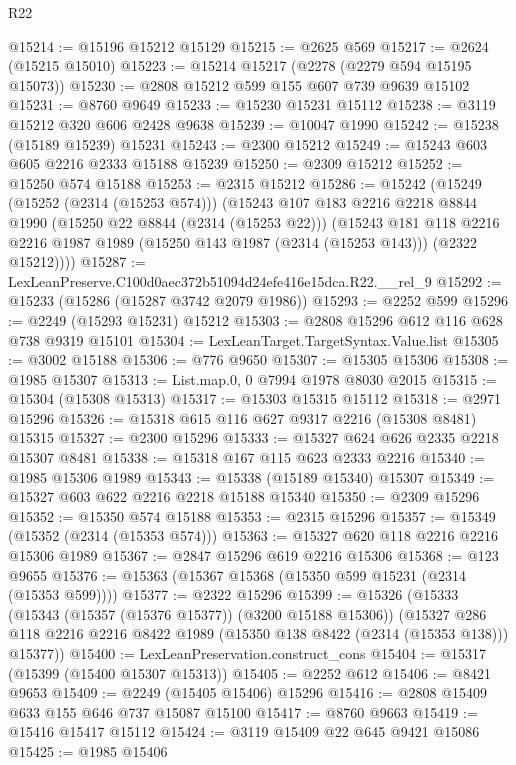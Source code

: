 \begin{lexlean}{R22}
\begin{coremodule}
@15214 := @15196 @15212 @15129
@15215 := @2625 @569
@15217 := @2624 (@15215 @15010)
@15223 := @15214 @15217 (@2278 (@2279 @594 @15195 @15073))
@15230 := @2808 @15212 @599 @155 @607 @739 @9639 @15102
@15231 := @8760 @9649
@15233 := @15230 @15231 @15112
@15238 := @3119 @15212 @320 @606 @2428 @9638
@15239 := @10047 @1990
@15242 := @15238 (@15189 @15239) @15231
@15243 := @2300 @15212
@15249 := @15243 @603 @605 @2216 @2333 @15188 @15239
@15250 := @2309 @15212
@15252 := @15250 @574 @15188
@15253 := @2315 @15212
@15286 := @15242
    (@15249
      (@15252 (@2314 (@15253 @574)))
      (@15243
        @107
        @183
        @2216
        @2218
        @8844
        @1990
        (@15250 @22 @8844 (@2314 (@15253 @22)))
        (@15243
          @181
          @118
          @2216
          @2216
          @1987
          @1989
          (@15250 @143 @1987 (@2314 (@15253 @143)))
          (@2322 @15212))))
@15287 := LexLeanPreserve.C100d0aec372b51094d24efe416e15dca.R22.__rel_9
@15292 := @15233 (@15286 (@15287 @3742 @2079 @1986))
@15293 := @2252 @599
@15296 := @2249 (@15293 @15231) @15212
@15303 := @2808 @15296 @612 @116 @628 @738 @9319 @15101
@15304 := LexLeanTarget.TargetSyntax.Value.list
@15305 := @3002 @15188
@15306 := @776 @9650
@15307 := @15305 @15306
@15308 := @1985 @15307
@15313 := List.map.{0, 0} @7994 @1978 @8030 @2015
@15315 := @15304 (@15308 @15313)
@15317 := @15303 @15315 @15112
@15318 := @2971 @15296
@15326 := @15318 @615 @116 @627 @9317 @2216 (@15308 @8481) @15315
@15327 := @2300 @15296
@15333 := @15327 @624 @626 @2335 @2218 @15307 @8481
@15338 := @15318 @167 @115 @623 @2333 @2216
@15340 := @1985 @15306 @1989
@15343 := @15338 (@15189 @15340) @15307
@15349 := @15327 @603 @622 @2216 @2218 @15188 @15340
@15350 := @2309 @15296
@15352 := @15350 @574 @15188
@15353 := @2315 @15296
@15357 := @15349 (@15352 (@2314 (@15353 @574)))
@15363 := @15327 @620 @118 @2216 @2216 @15306 @1989
@15367 := @2847 @15296 @619 @2216 @15306
@15368 := @123 @9655
@15376 := @15363 (@15367 @15368 (@15350 @599 @15231 (@2314 (@15353 @599))))
@15377 := @2322 @15296
@15399 := @15326
    (@15333
      (@15343 (@15357 (@15376 @15377)) (@3200 @15188 @15306))
      (@15327 @286 @118 @2216 @2216 @8422 @1989 (@15350 @138 @8422 (@2314 (@15353 @138))) @15377))
@15400 := LexLeanPreservation.construct_cons
@15404 := @15317 (@15399 (@15400 @15307 @15313))
@15405 := @2252 @612
@15406 := @8421 @9653
@15409 := @2249 (@15405 @15406) @15296
@15416 := @2808 @15409 @633 @155 @646 @737 @15087 @15100
@15417 := @8760 @9663
@15419 := @15416 @15417 @15112
@15424 := @3119 @15409 @22 @645 @9421 @15086
@15425 := @1985 @15406

\end{coremodule}
\end{lexlean}
